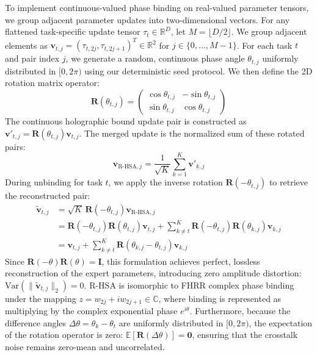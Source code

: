 \documentclass{article}
\theoremstyle{plain}
\theoremstyle{definition}
\theoremstyle{remark}
\begin{document}
To implement continuous-valued phase binding on real-valued parameter tensors, we group adjacent parameter updates into two-dimensional vectors. For any flattened task-specific update tensor $\tau_t \in \mathbb{R}^D$, let $M = \lfloor D/2 \rfloor$. We group adjacent elements as $\mathbf{v}_{t,j} = (\tau_{t,2j}, \tau_{t,2j+1})^T \in \mathbb{R}^2$ for $j \in \{0, \dots, M-1\}$. For each task $t$ and pair index $j$, we generate a random, continuous phase angle $\theta_{t,j}$ uniformly distributed in $[0, 2\pi)$ using our deterministic seed protocol. We then define the 2D rotation matrix operator:
\begin{equation}
    \mathbf{R}(\theta_{t,j}) = \begin{pmatrix} \cos\theta_{t,j} & -\sin\theta_{t,j} \\ \sin\theta_{t,j} & \cos\theta_{t,j} \end{pmatrix}
\end{equation}
The continuous holographic bound update pair is constructed as $\mathbf{v}'_{t,j} = \mathbf{R}(\theta_{t,j}) \mathbf{v}_{t,j}$. The merged update is the normalized sum of these rotated pairs:
\begin{equation}
    \mathbf{v}_{\text{R-HSA},j} = \frac{1}{\sqrt{K}} \sum_{k=1}^K \mathbf{v}'_{k,j}
\end{equation}
During unbinding for task $t$, we apply the inverse rotation \mbox{$\mathbf{R}(-\theta_{t,j})$} to retrieve the reconstructed pair:
\begin{align}
    \tilde{\mathbf{v}}_{t,j} &= \sqrt{K} \, \mathbf{R}(-\theta_{t,j}) \mathbf{v}_{\text{R-HSA},j} \nonumber \\
    &= \mathbf{R}(-\theta_{t,j}) \mathbf{R}(\theta_{t,j}) \mathbf{v}_{t,j} + \sum_{k \neq t}^K \mathbf{R}(-\theta_{t,j}) \mathbf{R}(\theta_{k,j}) \mathbf{v}_{k,j} \nonumber \\
    &= \mathbf{v}_{t,j} + \sum_{k \neq t}^K \mathbf{R}(\theta_{k,j} - \theta_{t,j}) \mathbf{v}_{k,j}
\end{align}
Since $\mathbf{R}(-\theta)\mathbf{R}(\theta) = \mathbf{I}$, this formulation achieves perfect, lossless reconstruction of the expert parameters, introducing zero amplitude distortion: $\text{Var}(\|\tilde{\mathbf{v}}_{t,j}\|_2) = 0$. R-HSA is isomorphic to FHRR complex phase binding under the mapping $z = w_{2j} + i w_{2j+1} \in \mathbb{C}$, where binding is represented as multiplying by the complex exponential phase $e^{i\theta}$. Furthermore, because the difference angles $\Delta\theta = \theta_k - \theta_t$ are uniformly distributed in $[0, 2\pi)$, the expectation of the rotation operator is zero: $\mathbb{E}[\mathbf{R}(\Delta\theta)] = \mathbf{0}$, ensuring that the crosstalk noise remains zero-mean and uncorrelated.
\end{document}
